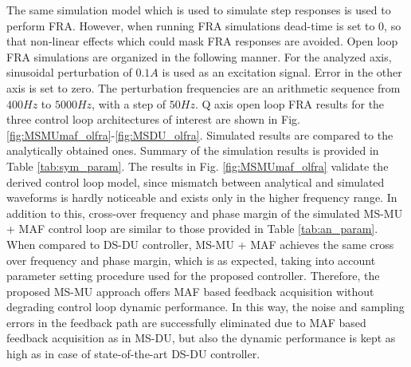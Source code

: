 \documentclass[journal]{IEEEtran}
\begin{document}
The same simulation model which is used to simulate step responses is used to perform FRA. However, when running FRA simulations  dead-time is set to $0$, so that non-linear effects which could mask FRA responses are avoided. Open loop FRA simulations are organized in the following manner. For the analyzed axis, sinusoidal perturbation of $0.1 A$ is used as an excitation signal. Error in the other axis is set to zero. The perturbation frequencies are an arithmetic sequence from $400 Hz$ to $5000 Hz$, with a step of $50 Hz$. Q axis open loop FRA results for the three control loop architectures of interest are shown in Fig. \ref{fig:MSMUmaf_olfra}-\ref{fig:MSDU_olfra}. Simulated results are compared to the analytically obtained ones. Summary of the simulation results is provided in Table \ref{tab:sym_param}. The results in Fig. \ref{fig:MSMUmaf_olfra} validate the derived control loop model, since mismatch between analytical and simulated waveforms is hardly noticeable and exists only in the higher frequency range. In addition to this, cross-over frequency and phase margin of the simulated MS-MU + MAF control loop are similar to those provided in Table \ref{tab:an_param}. When compared to DS-DU controller, MS-MU + MAF achieves the same cross over frequency and phase margin, which is as expected, taking into account parameter setting procedure used for the proposed controller. Therefore, the proposed MS-MU approach offers MAF based feedback acquisition without degrading control loop dynamic performance. In this way, the noise and sampling errors in the feedback path are successfully eliminated due to MAF based feedback acquisition as in MS-DU, but also the dynamic performance is kept as high as in case of state-of-the-art DS-DU controller. \par
\end{document}
